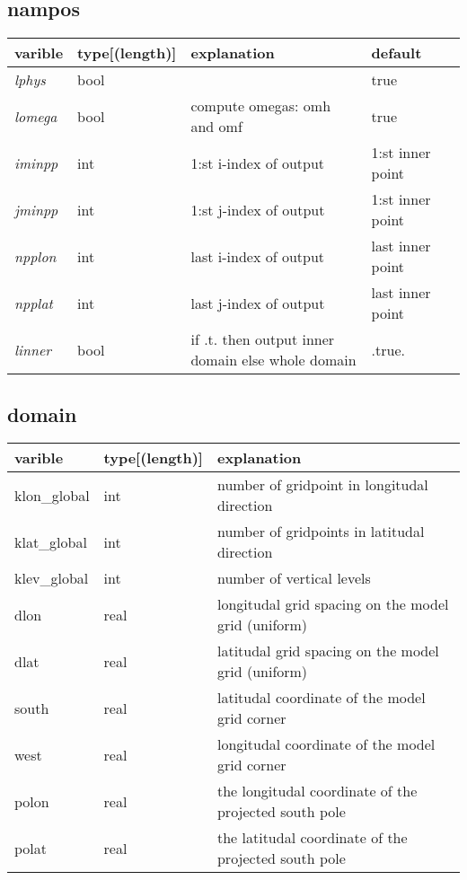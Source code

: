 \documentclass{article}
\begin{document}
\subsection{nampos}
\begin{tabular}{|l|l|l|l|l|}
  \hline
  varible & type[(length)] & explanation & default\\
  \hline
  \hline
  \emph{lphys} & bool &      & true \\
  \emph{lomega} & bool &  compute omegas: omh and omf & true \\
  \emph{iminpp} & int & 1:st i-index of output & 1:st inner point \\ 	
  \emph{jminpp} & int & 1:st j-index of output & 1:st inner point \\ 	
  \emph{npplon} & int & last i-index of output & last inner point \\ 	
  \emph{npplat} & int & last j-index of output & last inner point \\ 	
  \emph{linner} & bool & if .t. then output inner domain else whole domain & .true. \\
 \hline
\end{tabular}

\subsection{domain}
\begin{tabular}{|l|l|l|}
  \hline
  varible & type[(length)] & explanation \\
  \hline
  \hline
  klon\_global & int & number of gridpoint in longitudal direction \\ 
  klat\_global & int & number of gridpoints in latitudal direction \\
  klev\_global & int & number of vertical levels \\
  dlon         & real & longitudal grid spacing on the model grid   (uniform) \\
  dlat         & real & latitudal grid spacing on the model grid  (uniform) \\
  south        & real & latitudal coordinate of the model grid corner \\
  west         & real & longitudal coordinate of the model grid corner \\
  polon        & real & the longitudal coordinate of the projected   south pole \\
  polat        & real & the latitudal coordinate of the projected  south pole \\
 \hline
\end{tabular}
\end{document}
